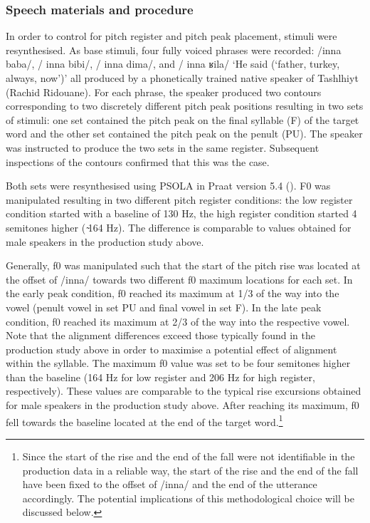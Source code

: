 \subsubsection{Speech materials and procedure}
In order to control for pitch register and pitch peak placement, stimuli were resynthesised. As base stimuli, four fully voiced phrases were recorded: /inna baba/, / inna bibi/, / inna dima/, and / inna ʁila/ ‘He said (‘father, turkey, always, now’)’ all produced by a phonetically trained native speaker of Tashlhiyt (Rachid Ridouane). For each phrase, the speaker produced two contours corresponding to two discretely different pitch peak positions resulting in two sets of stimuli: one set contained the pitch peak on the final syllable (F) of the target word and the other set contained the pitch peak on the penult (PU). The speaker was instructed to produce the two sets in the same register. Subsequent inspections of the contours confirmed that this was the case.

Both sets were resynthesised using \uppercase{psola} in Praat version 5.4 (\citealt{Praat2015}). F0 was manipulated resulting in two different pitch register conditions: the low register condition started with a baseline of 130 Hz, the high register condition started 4 semitones higher (  ̴164 Hz). The difference is comparable to values obtained for male speakers in the production study above.

\largerpage[-2]
Generally, f0 was manipulated such that the start of the pitch rise was located at the offset of /inna/ towards two different f0 maximum locations for each set. In the early peak condition, f0 reached its maximum at 1/3 of the way into the vowel (penult vowel in set PU and final vowel in set F). In the late peak condition, f0 reached its maximum at 2/3 of the way into the respective vowel. Note that the alignment differences exceed those typically found in the production study above in order to maximise a potential effect of alignment within the syllable. The maximum f0 value was set to be four semitones higher than the baseline (164 Hz for low register and 206 Hz for high register, respectively). These values are comparable to the typical rise excursions obtained for male speakers in the production study above. After reaching its maximum, f0 fell towards the baseline located at the end of the target word.\footnote{Since the start of the rise and the end of the fall were not identifiable in the production data in a reliable way, the start of the rise and the end of the fall have been fixed to the offset of /inna/ and the end of the utterance accordingly. The potential implications of this methodological choice will be discussed below.}

